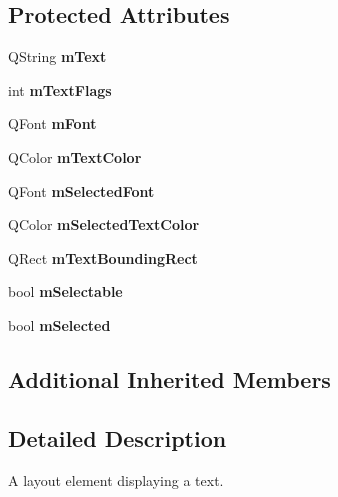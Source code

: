 \subsection*{Protected Attributes}
\begin{DoxyCompactItemize}
\item 
\mbox{\label{classQCPTextElement_a2ef3d8f044b2a0520c90561b3b533028}} 
Q\+String {\bfseries m\+Text}
\item 
\mbox{\label{classQCPTextElement_a221eb95ecda1056eb79d56f1230f45d5}} 
int {\bfseries m\+Text\+Flags}
\item 
\mbox{\label{classQCPTextElement_a2fef52fa1ec006799102b2956133ba29}} 
Q\+Font {\bfseries m\+Font}
\item 
\mbox{\label{classQCPTextElement_a3685263a99eacd98b180d29adc8e8830}} 
Q\+Color {\bfseries m\+Text\+Color}
\item 
\mbox{\label{classQCPTextElement_a5d242628c9c4beb361b82676c4851c38}} 
Q\+Font {\bfseries m\+Selected\+Font}
\item 
\mbox{\label{classQCPTextElement_ad523a852d47bc97b1af62a4d0dedf2ad}} 
Q\+Color {\bfseries m\+Selected\+Text\+Color}
\item 
\mbox{\label{classQCPTextElement_a226bb09aae41b1d106f6b00d52def0cb}} 
Q\+Rect {\bfseries m\+Text\+Bounding\+Rect}
\item 
\mbox{\label{classQCPTextElement_a112e8f9898991fe54f94fcb7effddc2f}} 
bool {\bfseries m\+Selectable}
\item 
\mbox{\label{classQCPTextElement_a7a46eb67459a3c8c80d19aa28b8ae791}} 
bool {\bfseries m\+Selected}
\end{DoxyCompactItemize}
\subsection*{Additional Inherited Members}


\subsection{Detailed Description}
A layout element displaying a text. 

